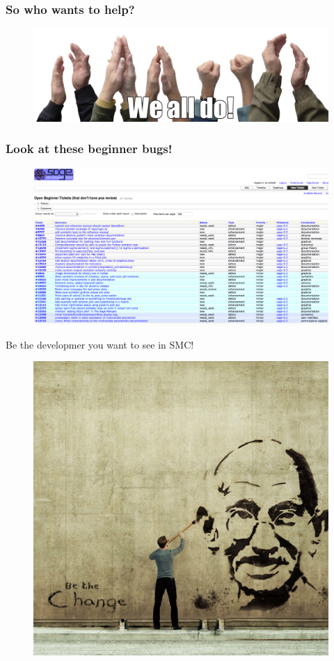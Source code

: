 \documentclass[xcolor=dvipsnames]{beamer}
\begin{document}
\begin{frame}

\frametitle{So who wants to help?}

\begin{figure}[H]
    \centering
        \includegraphics[width=1\textwidth]{clapping}
\end{figure}

\end{frame}

\begin{frame}

\frametitle{Look at these beginner bugs!}

\begin{figure}[H]
    \centering
        \includegraphics[width=1\textwidth]{beginbugs}
\end{figure}

\end{frame}

\begin{frame}

\centerline{Be the developmer you want to see in SMC!}

\begin{figure}[H]
    \centering
        \includegraphics[width=.60\textwidth]{bethechange}
\end{figure}

\end{frame}
\end{document}
